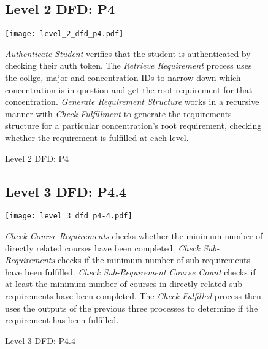 \documentclass[12pt]{article}
\begin{document}
\begin{figure}[p!]
  \subsection{Level 2 DFD: P4}
  \centering
  \texttt{[image: level\_2\_dfd\_p4.pdf]}
  \caption{Level 2 DFD: P4}
  \begin{flushleft}
    \emph{Authenticate Student} verifies that the student is authenticated by checking their auth
    token. The \emph{Retrieve Requirement} process uses the collge, major and concentration IDs to
    narrow down which concentration is in question and get the root requirement for that
    concentration. \emph{Generate Requirement Structure} works in a recursive manner with 
    \emph{Check Fulfillment} to generate the requirements structure for a particular concentration's
    root requirement, checking whether the requirement is fulfilled at each level.
  \end{flushleft}
\end{figure}

\begin{figure}[p!]
  \subsection{Level 3 DFD: P4.4}
  \centering
  \texttt{[image: level\_3\_dfd\_p4-4.pdf]}
  \caption{Level 3 DFD: P4.4}
  \begin{flushleft}
    \emph{Check Course Requirements} checks whether the minimum number of directly related courses
    have been completed. \emph{Check Sub-Requirements} checks if the minimum number of
    sub-requirements have been fulfilled. \emph{Check Sub-Requirement Course Count} checks if at
    least the minimum number of courses in directly related sub-requirements have been completed.
    The \emph{Check Fulfilled} process then uses the outputs of the previous three processes to
    determine if the requirement has been fulfilled.
  \end{flushleft}
\end{figure}

\clearpage
\end{document}
